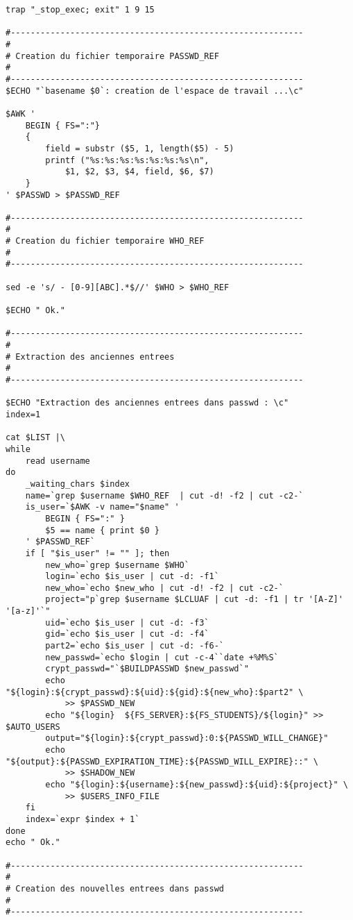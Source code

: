 \begin{verbatim}
trap "_stop_exec; exit" 1 9 15

#-----------------------------------------------------------
#
# Creation du fichier temporaire PASSWD_REF
#
#-----------------------------------------------------------
$ECHO "`basename $0`: creation de l'espace de travail ...\c"

$AWK '
    BEGIN { FS=":"}
    {
        field = substr ($5, 1, length($5) - 5)
        printf ("%s:%s:%s:%s:%s:%s:%s\n",
            $1, $2, $3, $4, field, $6, $7)
    }
' $PASSWD > $PASSWD_REF

#-----------------------------------------------------------
#
# Creation du fichier temporaire WHO_REF
#
#-----------------------------------------------------------

sed -e 's/ - [0-9][ABC].*$//' $WHO > $WHO_REF

$ECHO " Ok."

#-----------------------------------------------------------
#
# Extraction des anciennes entrees
#
#-----------------------------------------------------------

$ECHO "Extraction des anciennes entrees dans passwd : \c"
index=1

cat $LIST |\
while
    read username
do
    _waiting_chars $index
    name=`grep $username $WHO_REF  | cut -d! -f2 | cut -c2-`
    is_user=`$AWK -v name="$name" '
        BEGIN { FS=":" }
        $5 == name { print $0 }
    ' $PASSWD_REF`
    if [ "$is_user" != "" ]; then
        new_who=`grep $username $WHO` 
        login=`echo $is_user | cut -d: -f1`
        new_who=`echo $new_who | cut -d! -f2 | cut -c2-`
        project="p`grep $username $LCLUAF | cut -d: -f1 | tr '[A-Z]' '[a-z]'`"
        uid=`echo $is_user | cut -d: -f3`
        gid=`echo $is_user | cut -d: -f4`
        part2=`echo $is_user | cut -d: -f6-`
        new_passwd=`echo $login | cut -c-4``date +%M%S`
        crypt_passwd="`$BUILDPASSWD $new_passwd`"
        echo "${login}:${crypt_passwd}:${uid}:${gid}:${new_who}:$part2" \
            >> $PASSWD_NEW
        echo "${login}  ${FS_SERVER}:${FS_STUDENTS}/${login}" >> $AUTO_USERS
        output="${login}:${crypt_passwd}:0:${PASSWD_WILL_CHANGE}"
        echo "${output}:${PASSWD_EXPIRATION_TIME}:${PASSWD_WILL_EXPIRE}::" \
            >> $SHADOW_NEW
        echo "${login}:${username}:${new_passwd}:${uid}:${project}" \
            >> $USERS_INFO_FILE 
    fi
    index=`expr $index + 1`
done
echo " Ok."

#-----------------------------------------------------------
#
# Creation des nouvelles entrees dans passwd
#
#-----------------------------------------------------------


\end{verbatim}
